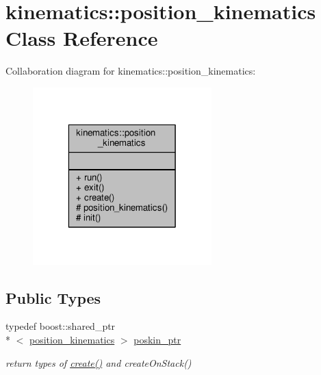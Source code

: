 \hypertarget{classkinematics_1_1position__kinematics}{\section{kinematics\-:\-:position\-\_\-kinematics Class Reference}
\label{classkinematics_1_1position__kinematics}
}


Collaboration diagram for kinematics\-:\-:position\-\_\-kinematics\-:\nopagebreak
\begin{figure}[H]
\begin{center}
\leavevmode
\includegraphics[width=196pt]{classkinematics_1_1position__kinematics__coll__graph}
\end{center}
\end{figure}
\subsection*{Public Types}
\begin{DoxyCompactItemize}
\item 
\hypertarget{classkinematics_1_1position__kinematics_a53ee0691aa91508e59b930b21dd0edad}{typedef boost\-::shared\-\_\-ptr\\*
$<$ \hyperlink{classkinematics_1_1position__kinematics}{position\-\_\-kinematics} $>$ \hyperlink{classkinematics_1_1position__kinematics_a53ee0691aa91508e59b930b21dd0edad}{poskin\-\_\-ptr}}\label{classkinematics_1_1position__kinematics_a53ee0691aa91508e59b930b21dd0edad}

\begin{DoxyCompactList}\small\item\em return types of \hyperlink{classkinematics_1_1position__kinematics_a589bbfbe9e504e5b9f74755b692cab8b}{create()} and create\-On\-Stack() \end{DoxyCompactList}\end{DoxyCompactItemize}
